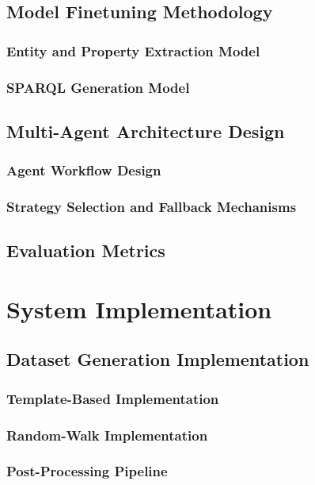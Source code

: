 \section{Model Finetuning Methodology}
\subsection{Entity and Property Extraction Model}
\subsection{SPARQL Generation Model}

\section{Multi-Agent Architecture Design}
\subsection{Agent Workflow Design}
\subsection{Strategy Selection and Fallback Mechanisms}

\section{Evaluation Metrics}

\chapter{System Implementation}
\label{bab:4}

\section{Dataset Generation Implementation}
\subsection{Template-Based Implementation}
\subsection{Random-Walk Implementation}
\subsection{Post-Processing Pipeline}

